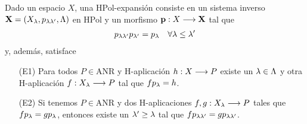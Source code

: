 \begin{proposition}
  Dado un espacio $ X  $, una HPol-expansión consiste en un sistema inverso $ \mathbf{X}   = (X_\lambda, p_{\lambda\lambda'},\Lambda)$ en HPol y un morfismo $ \mathbf{p}:X\longrightarrow \mathbf{X} $ tal que 
  \begin{gather*}
    p_{\lambda\lambda'}p_{\lambda'} = p_\lambda \quad \forall \lambda\leq \lambda'
  \end{gather*}
  y, además, satisface 
  \begin{enumerate}
    \item[(E1)] \label{e1} Para todos $ P \in \text{ANR} $ y H-aplicación $ h:X\longrightarrow P  $ existe un $ \lambda\in \Lambda $ y otra H-aplicación $ f:X_\lambda\longrightarrow P  $ tal que $ fp_\lambda = h  $.
    \item[(E2)] \label{e2} Si tenemos $ P \in \text{ANR} $  y  dos H-aplicaciones $ f,g:X_\lambda\longrightarrow P  $ tales que $ fp_\lambda = gp_\lambda  $, entonces existe un $ \lambda'\geq \lambda  $ tal que $ fp_{\lambda\lambda'} = gp_{\lambda\lambda' } $.
  \end{enumerate}
\end{proposition}


